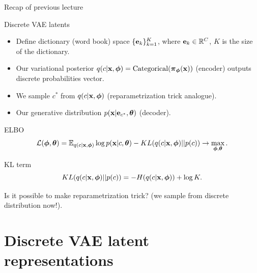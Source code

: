 \begin{frame}{Recap of previous lecture}
	\begin{block}{Discrete VAE latents}
		\begin{itemize}
			\item Define dictionary (word book) space $\{\mathbf{e}_k\}_{k=1}^K$, where $\mathbf{e}_k \in \mathbb{R}^C$, $K$ is the size of the dictionary.
			\item Our variational posterior $q(c | \mathbf{x}, \boldsymbol{\phi}) = \text{Categorical}(\boldsymbol{\pi}_{\boldsymbol{\phi}}(\mathbf{x}))$ (encoder) outputs discrete probabilities vector.
			\item We sample $c^*$ from $q(c | \mathbf{x}, \boldsymbol{\phi})$ (reparametrization trick analogue).
			\item Our generative distribution $p(\mathbf{x} | \mathbf{e}_{c^*}, \boldsymbol{\theta})$ (decoder).
		\end{itemize}
	\end{block}
	\vspace{-0.3cm}
	\begin{block}{ELBO}
		\vspace{-0.7cm}
		\[
		\mathcal{L} (\boldsymbol{\phi}, \boldsymbol{\theta})  = \mathbb{E}_{q(c | \mathbf{x}, \boldsymbol{\phi})} \log p(\mathbf{x} | c, \boldsymbol{\theta}) - KL(q(c| \mathbf{x}, \boldsymbol{\phi}) || p(c)) \rightarrow \max_{\boldsymbol{\phi}, \boldsymbol{\theta}}.
		\]
		\vspace{-0.7cm}
	\end{block}
	\begin{block}{KL term}
		\vspace{-0.4cm}
		\[
		KL(q(c| \mathbf{x}, \boldsymbol{\phi}) || p(c)) = - H(q(c | \mathbf{x}, \boldsymbol{\phi})) + \log K. 
		\]
	\end{block}
	Is it possible to make reparametrization trick? (we sample from discrete distribution now!).
\end{frame}
\section{Discrete VAE latent representations}
